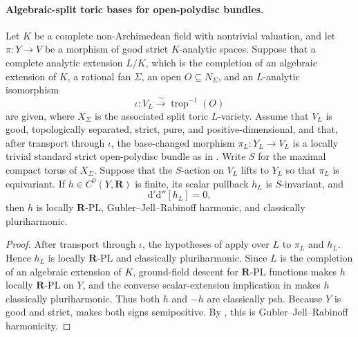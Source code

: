 \paragraph{Algebraic-split toric bases for open-polydisc bundles.}
\begin{corollary}
\label{cor:p062-algebraic-split-invariant-toric-open-polydisc-bundles}
Let \(K\) be a complete non-Archimedean field with nontrivial valuation,
and let \(\pi:Y\to V\) be a morphism of good strict \(K\)-analytic
spaces.  Suppose that a complete analytic extension \(L/K\), which is the
completion of an algebraic extension of \(K\), a rational fan \(\Sigma\),
an open \(O\subseteq N_\Sigma\), and an \(L\)-analytic
isomorphism
\[
       \iota:V_L\xrightarrow{\sim}\operatorname{trop}^{-1}(O)
\]
are given, where \(X_\Sigma\) is the associated split toric \(L\)-variety.
Assume that \(V_L\) is good, topologically separated, strict, pure, and
positive-dimensional, and that, after transport through \(\iota\), the
base-changed morphism \(\pi_L:Y_L\to V_L\) is a locally trivial standard
strict open-polydisc bundle as in
.  Write \(S\) for the maximal
compact torus of \(X_\Sigma\).  Suppose that the \(S\)-action on \(V_L\)
lifts to \(Y_L\) so that \(\pi_L\) is equivariant.  If \(h\in
C^0(Y,\mathbf R)\) is finite, its scalar pullback \(h_L\) is
\(S\)-invariant, and
\[
                         \mathrm d'\mathrm d''[h_L]=0,
\]
then \(h\) is locally \(\mathbf R\)-PL, Gubler--Jell--Rabinoff harmonic,
and classically pluriharmonic.
\end{corollary}

\begin{proof}
After transport through \(\iota\), the hypotheses of
 apply over \(L\) to
\(\pi_L\) and \(h_L\).  Hence \(h_L\) is locally \(\mathbf R\)-PL and
classically pluriharmonic.  Since \(L\) is the completion of an algebraic
extension of \(K\), ground-field descent for \(\mathbf R\)-PL functions
\cite[Corollary~5.12]{GJR26} makes \(h\) locally \(\mathbf R\)-PL on \(Y\),
and the converse scalar-extension implication in
\cite[Proposition~7.2(6)]{GR25Classical} makes \(h\) classically
pluriharmonic.  Thus both \(h\) and \(-h\) are classically psh.  Because
\(Y\) is good and strict, \cite[Theorem~4.3]{GR25Classical} makes both
signs semipositive.  By \cite[Definition~7.2]{GJR26}, this is
Gubler--Jell--Rabinoff harmonicity.
\end{proof}

